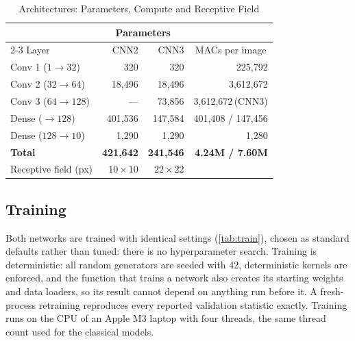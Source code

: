 \documentclass[conference]{IEEEtran}
\begin{document}
\begin{table}[t]
  \centering
  \caption{Architectures: Parameters, Compute and Receptive Field}
  \label{tab:arch}
  \setlength{\tabcolsep}{4pt}
  \begin{tabular}{@{}l r r r r@{}}
    \toprule
    & \multicolumn{2}{c}{Parameters} & & \\
    \cmidrule(lr){2-3}
    Layer & CNN2 & CNN3 & \multicolumn{2}{c}{MACs per image} \\
    \midrule
    Conv 1 ($1\to32$)            & 320       & 320       & \multicolumn{2}{r}{225{,}792} \\
    Conv 2 ($32\to64$)           & 18{,}496  & 18{,}496  & \multicolumn{2}{r}{3{,}612{,}672} \\
    Conv 3 ($64\to128$)          & ---       & 73{,}856  & \multicolumn{2}{r}{3{,}612{,}672\,(CNN3)} \\
    Dense ($\to128$)             & 401{,}536 & 147{,}584 & \multicolumn{2}{r}{401{,}408 / 147{,}456} \\
    Dense ($128\to10$)           & 1{,}290   & 1{,}290   & \multicolumn{2}{r}{1{,}280} \\
    \midrule
    \textbf{Total}               & \textbf{421{,}642} & \textbf{241{,}546} & \multicolumn{2}{r}{\textbf{4.24M / 7.60M}} \\
    Receptive field (px)         & $10\times10$ & $22\times22$ & & \\
    \bottomrule
  \end{tabular}
\end{table}

\subsection{Training}
Both networks are trained with identical settings (\cref{tab:train}), chosen as standard defaults rather than tuned:
there is no hyperparameter search. Training is deterministic: all random generators are seeded with 42,
deterministic kernels are enforced, and the function that trains a network also creates its starting weights and data
loaders, so its result cannot depend on anything run before it. A fresh-process retraining reproduces every reported
validation statistic exactly. Training runs on the CPU of an Apple M3 laptop with four threads, the same thread count
used for the classical models.
\end{document}
